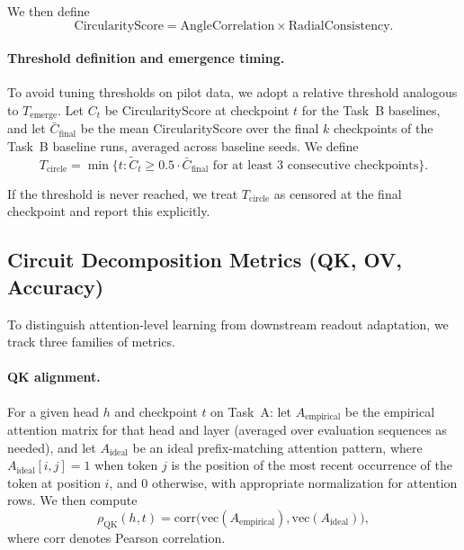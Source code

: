 \documentclass[11pt]{article}
\begin{document}
We then define
\[
  \text{CircularityScore} = \text{AngleCorrelation} \times \text{RadialConsistency}.
\]

\paragraph{Threshold definition and emergence timing.}
To avoid tuning thresholds on pilot data, we adopt a relative threshold analogous to $T_{\text{emerge}}$. Let $C_t$ be CircularityScore at checkpoint $t$ for the Task~B baselines, and let $\bar{C}_{\text{final}}$ be the mean CircularityScore over the final $k$ checkpoints of the Task~B baseline runs, averaged across baseline seeds. We define
\[
  T_{\text{circle}} = \min \{ t : \tilde{C}_t \ge 0.5 \cdot \bar{C}_{\text{final}} \text{ for at least 3 consecutive checkpoints} \}.
\]

If the threshold is never reached, we treat $T_{\text{circle}}$ as censored at the final checkpoint and report this explicitly.

\subsection{Circuit Decomposition Metrics (QK, OV, Accuracy)}

To distinguish attention-level learning from downstream readout adaptation, we track three families of metrics.

\paragraph{QK alignment.}
For a given head $h$ and checkpoint $t$ on Task~A: let $A_{\text{empirical}}$ be the empirical attention matrix for that head and layer (averaged over evaluation sequences as needed), and let $A_{\text{ideal}}$ be an ideal prefix-matching attention pattern, where $A_{\text{ideal}}[i, j] = 1$ when token $j$ is the position of the most recent occurrence of the token at position $i$, and 0 otherwise, with appropriate normalization for attention rows. We then compute
\[
  \rho_{\text{QK}}(h, t) = \mathrm{corr}\big( \mathrm{vec}(A_{\text{empirical}}), \mathrm{vec}(A_{\text{ideal}}) \big),
\]
where $\mathrm{corr}$ denotes Pearson correlation.
\end{document}
